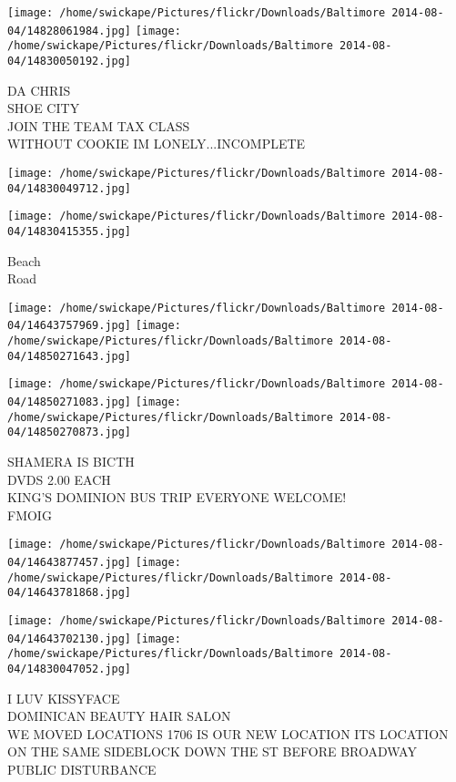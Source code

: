 \documentclass[10pt,letterpaper]{article}
\begin{document}
\texttt{[image: /home/swickape/Pictures/flickr/Downloads/Baltimore 2014-08-04/14828061984.jpg]}
\texttt{[image: /home/swickape/Pictures/flickr/Downloads/Baltimore 2014-08-04/14830050192.jpg]}

DA CHRIS\\
SHOE CITY\\
JOIN THE TEAM TAX CLASS\\
WITHOUT COOKIE IM LONELY...INCOMPLETE
\pagebreak

\texttt{[image: /home/swickape/Pictures/flickr/Downloads/Baltimore 2014-08-04/14830049712.jpg]}

\vspace{0.25in}
\texttt{[image: /home/swickape/Pictures/flickr/Downloads/Baltimore 2014-08-04/14830415355.jpg]}

Beach\\
Road
\pagebreak

\texttt{[image: /home/swickape/Pictures/flickr/Downloads/Baltimore 2014-08-04/14643757969.jpg]}
\texttt{[image: /home/swickape/Pictures/flickr/Downloads/Baltimore 2014-08-04/14850271643.jpg]}

\texttt{[image: /home/swickape/Pictures/flickr/Downloads/Baltimore 2014-08-04/14850271083.jpg]}
\texttt{[image: /home/swickape/Pictures/flickr/Downloads/Baltimore 2014-08-04/14850270873.jpg]}

SHAMERA IS BICTH\\
DVDS 2.00 EACH\\
KING'S DOMINION BUS TRIP EVERYONE WELCOME!\\
FMOIG
\pagebreak

\texttt{[image: /home/swickape/Pictures/flickr/Downloads/Baltimore 2014-08-04/14643877457.jpg]}
\texttt{[image: /home/swickape/Pictures/flickr/Downloads/Baltimore 2014-08-04/14643781868.jpg]}

\texttt{[image: /home/swickape/Pictures/flickr/Downloads/Baltimore 2014-08-04/14643702130.jpg]}
\texttt{[image: /home/swickape/Pictures/flickr/Downloads/Baltimore 2014-08-04/14830047052.jpg]}

I LUV KISSYFACE\\
DOMINICAN BEAUTY HAIR SALON\\
WE MOVED LOCATIONS 1706 IS OUR NEW LOCATION ITS LOCATION ON THE SAME SIDEBLOCK DOWN THE ST BEFORE BROADWAY\\
PUBLIC DISTURBANCE
\pagebreak
\end{document}
